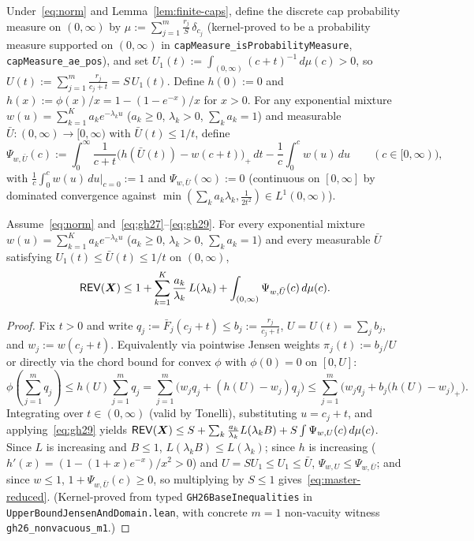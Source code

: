 Under~\eqref{eq:norm} and Lemma~\ref{lem:finite-caps}, define the discrete cap probability measure on $(0,\infty)$ by $\mu := \sum_{j=1}^m \frac{r_j}{S}\,\delta_{c_j}$ (kernel-proved to be a probability measure supported on $(0,\infty)$ in \texttt{capMeasure\_isProbabilityMeasure}, \texttt{capMeasure\_ae\_pos}), and set $U_1(t) := \int_{(0,\infty)} (c+t)^{-1}\,d\mu(c) > 0$, so $U(t) := \sum_{j=1}^m \frac{r_j}{c_j+t} = S\,U_1(t)$. Define $h(0) := 0$ and $h(x) := \phi(x)/x = 1 - (1-e^{-x})/x$ for $x > 0$. For any exponential mixture $w(u) = \sum_{k=1}^K a_k e^{-\lambda_k u}$ ($a_k \ge 0$, $\lambda_k > 0$, $\sum_k a_k = 1$) and measurable $\bar{U} : (0,\infty) \to [0,\infty)$ with $\bar{U}(t) \le 1/t$, define
\begin{equation}\label{eq:psi-def}
  \Psi_{w,\bar{U}}(c) := \int_0^\infty \frac{1}{c+t}\big(h(\bar{U}(t)) - w(c+t)\big)_+\,dt - \frac{1}{c}\int_0^c w(u)\,du \qquad (c \in [0,\infty)),
\end{equation}
with $\frac{1}{c}\int_0^c w(u)\,du|_{c=0} := 1$ and $\Psi_{w,\bar{U}}(\infty) := 0$ (continuous on $[0,\infty]$ by dominated convergence against $\min(\sum_k a_k\lambda_k, \frac{1}{2t^2}) \in L^1(0,\infty)$).

\begin{lemma}\label{lem:jensen-mono}
Assume~\eqref{eq:norm} and~\eqref{eq:gh27}--\eqref{eq:gh29}. For every exponential mixture $w(u) = \sum_{k=1}^K a_k e^{-\lambda_k u}$ ($a_k \ge 0$, $\lambda_k > 0$, $\sum_k a_k = 1$) and every measurable $\bar{U}$ satisfying $U_1(t) \le \bar{U}(t) \le 1/t$ on $(0,\infty)$,
\begin{equation}\label{eq:master-reduced}
  \mathsf{REV}(\bm{X}) \le 1 + \sum_{k=1}^K \frac{a_k}{\lambda_k}\,L(\lambda_k) + \int_{(0,\infty)} \Psi_{w,\bar{U}}(c)\,d\mu(c).
\end{equation}
\end{lemma}

\begin{proof}
Fix $t > 0$ and write $q_j := \bar{F}_j(c_j+t) \le b_j := \frac{r_j}{c_j+t}$, $U = U(t) = \sum_j b_j$, and $w_j := w(c_j+t)$. Equivalently via pointwise Jensen weights $\pi_j(t) := b_j/U$ or directly via the chord bound for convex $\phi$ with $\phi(0) = 0$ on $[0, U]$:
\[
  \phi\!\left(\sum_{j=1}^m q_j\right)
  \le h(U)\sum_{j=1}^m q_j
  = \sum_{j=1}^m \Big(w_j q_j + (h(U) - w_j)q_j\Big)
  \le \sum_{j=1}^m \Big(w_j q_j + b_j\big(h(U) - w_j\big)_+\Big).
\]
Integrating over $t \in (0,\infty)$ (valid by Tonelli), substituting $u = c_j + t$, and applying~\eqref{eq:gh29} yields $\mathsf{REV}(\bm{X}) \le S + \sum_k \frac{a_k}{\lambda_k}L(\lambda_k B) + S\int \Psi_{w,U}(c)\,d\mu(c)$. Since $L$ is increasing and $B \le 1$, $L(\lambda_k B) \le L(\lambda_k)$; since $h$ is increasing ($h'(x) = (1-(1+x)e^{-x})/x^2 > 0$) and $U = SU_1 \le U_1 \le \bar{U}$, $\Psi_{w,U} \le \Psi_{w,\bar{U}}$; and since $w \le 1$, $1 + \Psi_{w,\bar{U}}(c) \ge 0$, so multiplying by $S \le 1$ gives~\eqref{eq:master-reduced}. (Kernel-proved from typed \texttt{GH26BaseInequalities} in \texttt{UpperBoundJensenAndDomain.lean}, with concrete $m = 1$ non-vacuity witness \texttt{gh26\_nonvacuous\_m1}.)
\end{proof}

